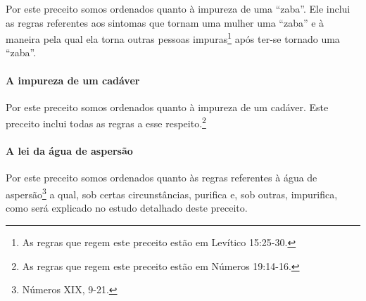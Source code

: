 Por este preceito somos ordenados quanto à impureza de uma ``zaba''.
Ele inclui as regras referentes aos sintomas que tornam uma mulher uma
``zaba'' e à maneira pela qual ela torna outras pessoas
impuras\footnote{As regras que regem este preceito estão em Levítico 15:25-30.} após ter-se tornado uma ``zaba''.

\paragraph{A impureza de um cadáver}

Por este preceito somos ordenados quanto à impureza de um cadáver. Este
preceito inclui todas as regras a esse respeito.\footnote{As regras que regem este preceito estão em Números 19:14-16.}

\paragraph{A lei da água de aspersão}

Por este preceito somos ordenados quanto às regras referentes à água
de aspersão\footnote{Números XIX, 9-21.} a qual, sob certas circunstâncias,
purifica e, sob outras, impurifica, como será explicado no estudo
detalhado deste preceito.

